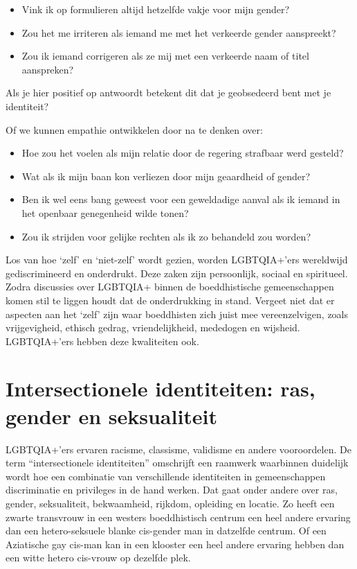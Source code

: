 \documentclass[12pt,openany]{book}
\begin{document}
\begin{itemize}

\item Vink ik op formulieren altijd hetzelfde vakje voor mijn gender?
\item Zou het me irriteren als iemand me met het verkeerde gender aanspreekt?
\item Zou ik iemand corrigeren als ze mij met een verkeerde naam of titel aanspreken?
\end{itemize}

Als je hier positief op antwoordt betekent dit dat je geobsedeerd bent met je identiteit?

Of we kunnen empathie ontwikkelen door na te denken over:

\begin{itemize}
\item Hoe zou het voelen als mijn relatie door de regering strafbaar werd gesteld?
\item Wat als ik mijn baan kon verliezen door mijn geaardheid of gender?
\item Ben ik wel eens bang geweest voor een geweldadige aanval als ik iemand in het openbaar genegenheid wilde tonen?
\item Zou ik strijden voor gelijke rechten als ik zo behandeld zou worden?
\end{itemize}

Los van hoe ‘zelf’ en ‘niet-zelf’ wordt gezien, worden LGBTQIA+’ers wereldwijd gediscrimineerd en onderdrukt. Deze zaken zijn persoonlijk, sociaal en spiritueel.  Zodra discussies over LGBTQIA+ binnen de boeddhistische gemeenschappen komen stil te liggen houdt dat de onderdrukking in stand.
Vergeet niet dat er aspecten aan het ‘zelf’ zijn waar boeddhisten zich juist mee vereenzelvigen, zoals vrijgevigheid, ethisch gedrag, vriendelijkheid, mededogen en wijsheid. LGBTQIA+’ers hebben deze kwaliteiten ook.

\section*{Intersectionele identiteiten: ras, gender en seksualiteit}

LGBTQIA+’ers ervaren racisme, classisme, validisme en andere vooroordelen. De term “intersectionele identiteiten” omschrijft een raamwerk waarbinnen duidelijk wordt hoe een combinatie van verschillende identiteiten in gemeenschappen discriminatie en privileges in de hand werken.  Dat gaat onder andere over ras, gender, seksualiteit, bekwaamheid, rijkdom, opleiding en locatie. Zo heeft een zwarte transvrouw in een westers boeddhistisch centrum een heel andere ervaring dan een hetero-seksuele blanke cis-gender man in datzelfde centrum. Of een Aziatische gay cis-man kan in een klooster een heel andere ervaring hebben dan een witte hetero cis-vrouw op dezelfde plek.  
\end{document}

